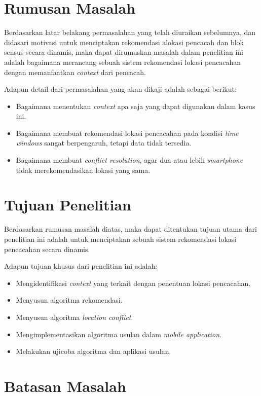\section{Rumusan Masalah}

Berdasarkan latar belakang permasalahan yang telah diuraikan sebelumnya, dan didasari motivasi untuk menciptakan rekomendasi alokasi pencacah dan blok sensus secara dinamis, maka dapat dirumuskan masalah dalam penelitian ini adalah bagaimana merancang sebuah sistem rekomendasi lokasi pencacahan dengan memanfaatkan \textit{context} dari pencacah.


Adapun detail dari permasalahan yang akan dikaji adalah sebagai berikut:

\begin{itemize}
\item Bagaimana menentukan \textit{context} apa saja yang dapat digunakan dalam kasus ini.
\item Bagaimana membuat rekomendasi lokasi pencacahan pada kondisi \textit{time windows} sangat berpengaruh, tetapi data tidak tersedia.
\item Bagaimana membuat \textit{conflict resolution}, agar dua atau lebih \textit{smartphone} tidak merekomendasikan lokasi yang sama.
\end{itemize}


\section{Tujuan Penelitian}

Berdasarkan rumusan masalah diatas, maka dapat ditentukan tujuan utama dari penelitian ini adalah untuk menciptakan sebuah sistem rekomendasi lokasi pencacahan secara dinamis. 

Adapun tujuan khusus dari penelitian ini adalah:

\begin{itemize}
\item Mengidentifikasi \textit{context} yang terkait dengan penentuan lokasi pencacahan.
\item Menyusun algoritma rekomendasi.
\item Menyusun algoritma \textit{location conflict}.
\item Mengimplementasikan algoritma usulan dalam \textit{mobile application}.
\item Melakukan ujicoba algoritma dan aplikasi usulan.
\end{itemize}


\section{Batasan Masalah}

